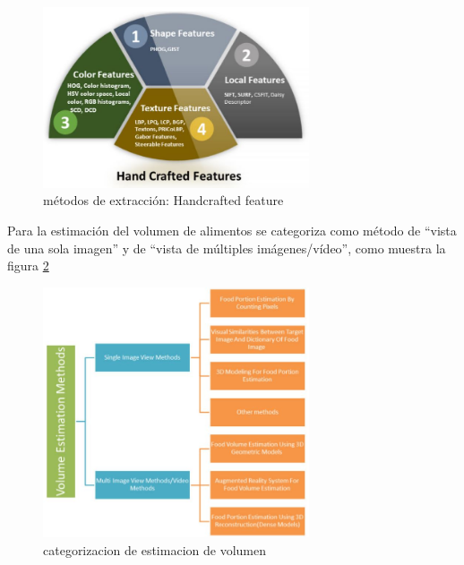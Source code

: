 \begin{figure}[h]
		\begin{center}
			\includegraphics[width=0.7\textwidth]{2/imagen2/2FIGURA2PAPER1.JPG}
			\caption{métodos de extracción: Handcrafted feature}
			\label{fig5}
		\end{center}
		
	\end{figure}

\thinspace

Para la estimación del volumen de alimentos se categoriza como método de “vista de una sola imagen” y de “vista de múltiples imágenes/vídeo”, como muestra la figura \ref{fig6}

\begin{figure}[h]
		\begin{center}
			\includegraphics[width=0.7\textwidth]{2/imagen2/3FIGURA3PAPER1.JPG}
			\caption{categorizacion de estimacion de volumen}
			\label{fig6}
		\end{center}
		
	\end{figure}

